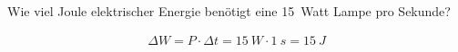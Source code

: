 
\begin{aufgabe}
Wie viel Joule elektrischer Energie benötigt eine \SI{15}{Watt} Lampe pro Sekunde?
\begin{loesung}
	\begin{eqnarray*}
	\Delta W = P \cdot \Delta t = \SI{15}{W} \cdot \SI{1}{s} = \SI{15}{J}
	\end{eqnarray*}
\end{loesung}
\end{aufgabe}

